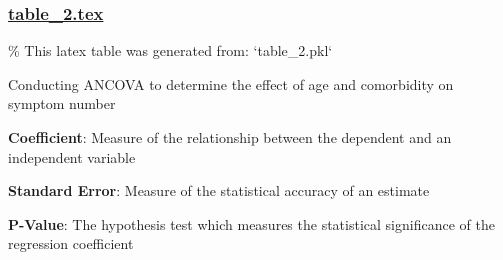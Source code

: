 \documentclass[11pt]{article}
\begin{document}
\subsubsection*{\hyperlink{code-LaTeX Table Design-table-2-tex}{table\_2.tex}}

\begin{codeoutput}
\% This latex table was generated from: `table\_2.pkl`
\begin{table}[h]
\caption{ANCOVA of symptom number on age and comorbidity}
\label{table:ancova}
\begin{threeparttable}
\renewcommand{\TPTminimum}{\linewidth}
\begin{tablenotes}
\footnotesize
\item Conducting ANCOVA to determine the effect of age and comorbidity on symptom number
\item \textbf{Coefficient}: Measure of the relationship between the dependent and an independent variable
\item \textbf{Standard Error}: Measure of the statistical accuracy of an estimate
\item \textbf{P-Value}: The hypothesis test which measures the statistical significance of the regression coefficient
\end{tablenotes}
\end{threeparttable}
\end{table}
\end{codeoutput}
\end{document}

